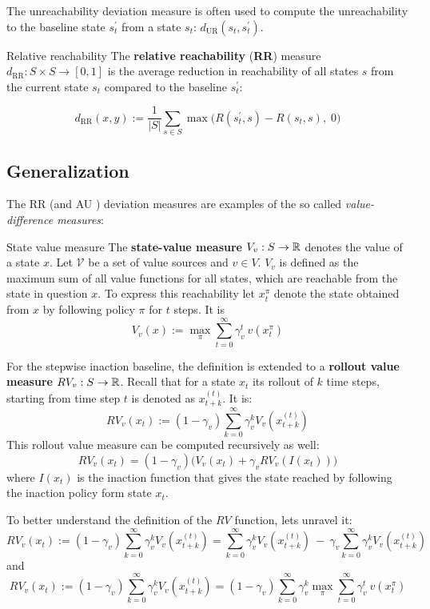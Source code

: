 The unreachability deviation measure is often used to compute the unreachability to the baseline state $s^\prime_t$ from a state $s_t$: $d_{\text{UR}}(s_t,s^\prime_t)$.


\begin{Definition}{Relative reachability}{}{}
	The \textbf{relative reachability} (\textbf{RR}) measure $d_{\text{RR}}: S\times S\to [0,1]$ is the average reduction in reachability of all states $s$ from the current state $s_t$ compared to the baseline $s^\prime_t$:
	
	\[ d_{\text{RR}}(x,y) := \frac{1}{|S|} \sum_{s\in S} \max\big( R(s^\prime_t, s)-R(s_t,s),\; 0 \big) \]
	
\end{Definition}

\subsection{Generalization}

The RR (and AU%
) deviation measures are examples of the so called \textit{value-difference measures}:

\begin{Definition}{State value measure}{}{}
	The \textbf{state-value measure} $V_v:S\to \mathbb{R}$ denotes the value of a state $x$. 
	Let $\mathcal{V}$ be a set of value sources and $v\in V$.
	$V_v$ is defined as the maximum sum of all value functions for all states, which are reachable from the state in question $x$. 
	To express this reachability let $x_t^{\pi}$ denote the state obtained from $x$ by following policy $\pi$ for $t$ steps. It is
	\[ V_v(x) := \max_\pi \sum_{t=0}^{\infty} \gamma_v^t \ v(x_t^{\pi}) \]
	
	For the stepwise inaction baseline, the definition is extended to a \textbf{rollout value measure} $RV_v:S\to\mathbb{R}$. Recall that for a state $x_t$ its rollout of $k$ time steps, starting from time step $t$ is denoted as $x_{t+k}^{(t)}$. It is:
	\[ RV_v(x_t) := (1-\gamma_v) \sum_{k=0}^{\infty} \gamma_v^k V_v(x^{(t)}_{t+k})  \]
	This rollout value measure can be computed recursively as well:
	\[ RV_v(x_t) = (1-\gamma_v) \big( V_v(x_t) + \gamma_v RV_v(I(x_t))\big)\]
	where $I(x_t)$ is the inaction function that gives the state reached by following the inaction policy form state $x_t$.
\end{Definition}
To better understand the definition of the $RV$ function, lets unravel it:
\[ RV_v(x_t) := (1-\gamma_v) \sum_{k=0}^{\infty} \gamma_v^k V_v(x^{(t)}_{t+k}) 
= \sum_{k=0}^{\infty} \gamma_v^k V_v(x^{(t)}_{t+k}) \ - \ \gamma_v \sum_{k=0}^{\infty} \gamma_v^k V_v(x^{(t)}_{t+k}) \]
and 
\[ RV_v(x_t) := (1-\gamma_v) \sum_{k=0}^{\infty} \gamma_v^k V_v(x^{(t)}_{t+k}) = (1-\gamma_v) \sum_{k=0}^{\infty} \gamma_v^k
\max_\pi \sum_{t=0}^{\infty} \gamma_v^t \ v(x_t^{\pi}) \]

